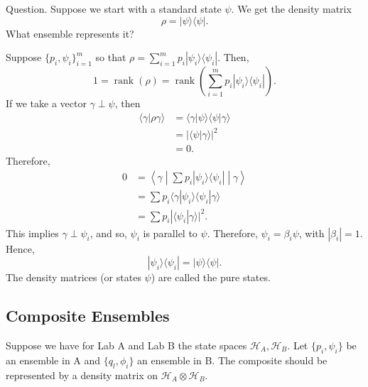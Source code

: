 \documentclass[12pt]{article}
\theoremstyle{definition}
\newcommand{\ketbra}[2]{|#1\rangle\langle #2|}
\begin{document}
Question. Suppose we start with a standard state $\psi$. We get the density matrix
\[
\rho = \ketbra{\psi}{\psi}.
\]
What ensemble represents it?

Suppose $\{p_i,\psi_i\}_{i=1}^m$ so that $\rho = \sum_{i=1}^m p_i \ketbra{\psi_i}{\psi_i}$. Then,
\[
1 = \operatorname{rank}(\rho) = \operatorname{rank}\left(\sum_{i=1}^m p_i \ketbra{\psi_i}{\psi_i}\right).
\]
If we take a vector $\gamma \perp \psi$, then
\begin{align*}
\langle\gamma|\rho\gamma\rangle &= \langle\gamma|\psi\rangle\langle\psi|\gamma\rangle \\
&= |\langle\psi|\gamma\rangle|^2 \\
&= 0.
\end{align*}
Therefore,
\begin{align*}
0 &= \left\langle\gamma\middle|\sum p_i \ketbra{\psi_i}{\psi_i}\middle|\gamma\right\rangle \\
&= \sum p_i \langle\gamma|\psi_i\rangle\langle\psi_i|\gamma\rangle \\
&= \sum p_i |\langle\psi_i|\gamma\rangle|^2.
\end{align*}
This implies $\gamma \perp \psi_i$, and so, $\psi_i$ is parallel to $\psi$. Therefore, $\psi_i = \beta_i\psi$, with $|\beta_i| = 1$. Hence,
\[
\ketbra{\psi_i}{\psi_i} = \ketbra{\psi}{\psi}.
\]
The density matrices (or states $\psi$) are called the pure states.

\subsection{Composite Ensembles}

Suppose we have for Lab A and Lab B the state spaces $\mathcal{H}_A, \mathcal{H}_B$. Let $\{p_i,\psi_i\}$ be an ensemble in A and $\{q_l,\phi_i\}$ an ensemble in B. The composite should be represented by a density matrix on $\mathcal{H}_A \otimes \mathcal{H}_B$.
\end{document}
